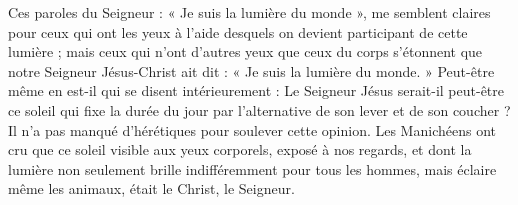Ces paroles du Seigneur : « Je suis la lumière du monde », me semblent claires pour ceux qui ont les yeux à l’aide desquels on devient participant de cette lumière ; mais ceux qui n’ont d’autres yeux que ceux du corps s’étonnent que notre Seigneur Jésus-Christ ait dit : « Je suis la lumière du monde. » Peut-être même en est-il qui se disent intérieurement : Le Seigneur Jésus serait-il peut-être ce soleil qui fixe la durée du jour par l’alternative de son lever et de son coucher ? Il n’a pas manqué d’hérétiques pour soulever cette opinion. Les Manichéens ont cru que ce soleil visible aux yeux corporels, exposé à nos regards, et dont la lumière non seulement brille indifféremment pour tous les hommes, mais éclaire même les animaux, était le Christ, le Seigneur.
